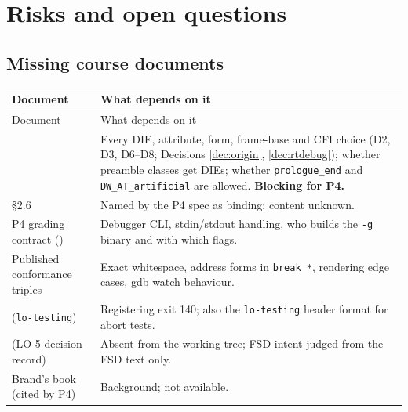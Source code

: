 \documentclass[10pt]{article}
\newcommand{\code}[1]{\texttt{\small #1}}
\begin{document}
\section{Risks and open questions}\label{sec:risks}

\subsection{Missing course documents}\label{sec:risk-docs}
\begin{xltabular}{\linewidth}{@{}L{4.4cm}Y@{}}
\toprule
Document & What depends on it \\
\midrule
\endfirsthead
\toprule Document & What depends on it \\ \midrule
\endhead
{} & Every DIE, attribute, form, frame-base and CFI choice (D2, D3, D6--D8; Decisions \ref{dec:origin}, \ref{dec:rtdebug}); whether preamble classes get DIEs; whether \code{prologue\_end} and \code{DW\_AT\_artificial} are allowed. \textbf{Blocking for P4.} \\
 §2.6 & Named by the P4 spec as binding; content unknown. \\
P4 grading contract () & Debugger CLI, stdin/stdout handling, who builds the \code{-g} binary and with which flags. \\
Published conformance triples & Exact whitespace, address forms in \code{break *}, rendering edge cases, gdb watch behaviour. \\
 (\code{lo-testing}) & Registering exit 140; also the \code{lo-testing} header format for abort tests. \\
 (LO-5 decision record) & Absent from the working tree; FSD intent judged from the FSD text only. \\
Brand's book (cited by P4) & Background; not available. \\
\bottomrule
\end{xltabular}
\end{document}
